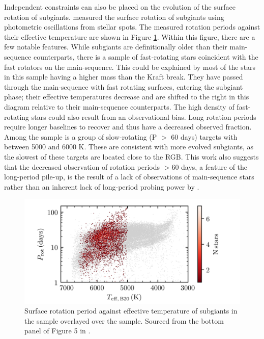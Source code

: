 Independent constraints can also be placed on the evolution of the surface rotation of subgiants.
\citet{santos_surface_2021} measured the surface rotation of  subgiants using photometric oscillations from stellar spots.
The measured rotation periods against their effective temperature are shown in Figure \ref{fig:subgiant_surface}.
Within this figure, there are a few notable features.
While subgiants are definitionally older than their main-sequence counterparts, there is a sample of fast-rotating stars coincident with the fast rotators on the main-sequence.
This could be explained by most of the stars in this sample having a higher mass than the Kraft break.
They have passed through the main-sequence with fast rotating surfaces, entering the subgiant phase; their effective temperatures decrease and are shifted to the right in this diagram relative to their main-sequence counterparts.
The high density of fast-rotating stars could also result from an observational bias.
Long rotation periods require longer baselines to recover and thus have a decreased observed fraction.
Among the sample is a group of slow-rotating (P $>$ 60 days) targets with \teff{} between 5000 and 6000 K.
These are consistent with more evolved subgiants, as the slowest of these targets are located close to the RGB.
This work also suggests that the decreased observation of rotation periods $>$60 days, a feature of the long-period pile-up, is the result of a lack of observations of main-sequence stars rather than an inherent lack of long-period probing power by \kepler. 

\begin{figure}[h]
    \includegraphics[width=\textwidth]{Figures/intro_figures/subgiant_surface.png}
    \caption[Surface rotation period distribution of subgiant stars.]{Surface rotation period against effective temperature of subgiants in the \citet{santos_surface_2021} sample overlayed over the \kepler{} \citet{mcquillan_rotation_2014} sample. 
    Sourced from the bottom panel of Figure 5 in \citet{santos_surface_2021}.}
    \label{fig:subgiant_surface}
\end{figure}

